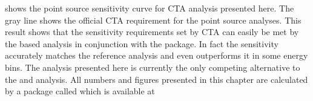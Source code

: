  shows the point source sensitivity curve for CTA analysis presented here.
The gray line shows the official CTA requirement for the point source analyses. 
This result shows that the sensitivity requirements set by CTA can easily be met by the \ctapipe based analysis 
in conjunction with the \aicttools package. 
In fact the sensitivity accurately matches the reference analysis and even outperforms it in some energy bins. 
The analysis presented here is currently the only competing alternative to the \mars and \eventdisplay analysis.
All numbers and figures presented in this chapter are calculated by a package called \ctaplots which is 
available at 




